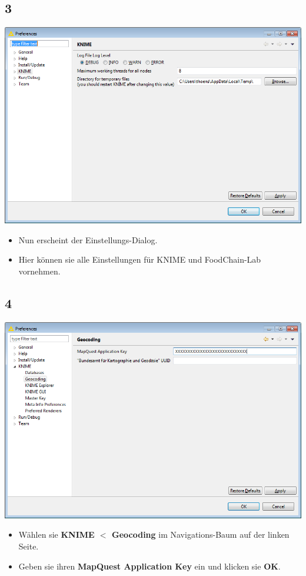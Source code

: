 \documentclass{beamer}
\begin{document}
\subsection{3}
\begin{frame}
	\begin{center}
  		\includegraphics[height=0.6\textheight]{3.png}
	\end{center}
	\begin{itemize}
		\item Nun erscheint der Einstellungs-Dialog.
		\item Hier können sie alle Einstellungen für KNIME und FoodChain-Lab vornehmen.
	\end{itemize}
\end{frame}

\subsection{4}
\begin{frame}
	\begin{center}
  		\includegraphics[height=0.6\textheight]{4.png}
	\end{center}
	\begin{itemize}
		\item Wählen sie \textbf{KNIME $<$ Geocoding} im Navigations-Baum auf der linken Seite.
		\item Geben sie ihren \textbf{MapQuest Application Key} ein und klicken sie \textbf{OK}.
	\end{itemize}
\end{frame}
\end{document}
